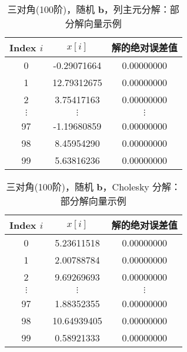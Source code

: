 \documentclass[UTF8]{ctexart}
\begin{document}
  \begin{table}[ht]
  \centering
  \caption{三对角(100阶)，随机 $\mathbf{b}$，列主元分解：部分解向量示例}
  \label{tab:tri100-randb-partialPivot}
  \begin{tabular}{ccc}
  \toprule
  \textbf{Index} $i$ & $x[i]$ & 解的绝对误差值 \\
  \midrule
  0   &  -0.29071664 & 0.00000000 \\
  1   &  12.79312675 & 0.00000000 \\
  2   &  3.75417163 & 0.00000000 \\
  $\vdots$ & $\vdots$ & $\vdots$\\
  97  &  -1.19680859 & 0.00000000 \\
  98  &  8.45954290  & 0.00000000\\
  99  &  5.63816236  & 0.00000000\\
  \bottomrule
  \end{tabular}
  \end{table}
\begin{table}[ht]
  \centering
  \caption{三对角(100阶)，随机 $\mathbf{b}$，Cholesky 分解：部分解向量示例}
  \label{tab:tri100-randb-cholesky}
  \begin{tabular}{ccc}
  \toprule
  \textbf{Index} $i$ & $x[i]$ & 解的绝对误差值\\
  \midrule
  0   &  5.23611518 & 0.00000000 \\
  1   &  2.00788784  & 0.00000000\\
  2   &  9.69269693  & 0.00000000\\
  $\vdots$ & $\vdots$  & $\vdots$\\
  97  &  1.88352355  & 0.00000000\\
  98  &  10.64939405  & 0.00000000\\
  99  &  0.58921333 & 0.00000000 \\
  \bottomrule
  \end{tabular}
  \end{table}
  
\end{document}
